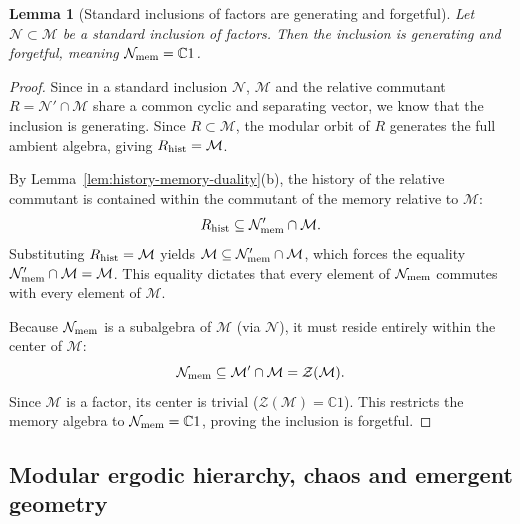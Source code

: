 \documentclass[a4paper,11pt]{article}
\newtheorem{lemma}[theorem]{Lemma}
\theoremstyle{definition}
\newcommand{\mN}{\mathcal{N}}
\newcommand{\mM}{\mathcal{M}}
\begin{document}
\begin{lemma}[Standard inclusions of factors are generating and forgetful]
\label{lem:standard-forgetful}
Let $\mathcal N \subset \mathcal M$ be a standard inclusion of factors. Then the inclusion is generating and forgetful, meaning $\mathcal N_{\rm mem} = \mathbb C1$.
\end{lemma}
\begin{proof}
Since in a standard inclusion $\mN$, $\mM$ and the relative commutant $R = \mathcal N' \cap \mathcal M$ share a common cyclic and separating vector, we know that the inclusion is generating. Since $R \subset \mathcal M$, the modular orbit of $R$ generates the full ambient algebra, giving $R_{\rm hist} = \mathcal M$. 

By Lemma~\ref{lem:history-memory-duality}(b), the history of the relative commutant is contained within the commutant of the memory relative to $\mathcal M$:
\begin{equation}
    R_{\rm hist} \subseteq \mathcal N_{\rm mem}' \cap \mathcal M.
\end{equation}
Substituting $R_{\rm hist} = \mathcal M$ yields $\mathcal M \subseteq \mathcal N_{\rm mem}' \cap \mathcal M$, which forces the equality $\mathcal N_{\rm mem}' \cap \mathcal M = \mathcal M$. This equality dictates that every element of $\mathcal N_{\rm mem}$ commutes with every element of $\mathcal M$. 

Because $\mathcal N_{\rm mem}$ is a subalgebra of $\mathcal M$ (via $\mathcal N$), it must reside entirely within the center of $\mathcal M$:
\begin{equation}
    \mathcal N_{\rm mem} \subseteq \mathcal M' \cap \mathcal M = \mathcal Z(\mathcal M).
\end{equation}
Since $\mathcal M$ is a factor, its center is trivial ($\mathcal Z(\mathcal M) = \mathbb C1$). This restricts the memory algebra to $\mathcal N_{\rm mem} = \mathbb C1$, proving the inclusion is forgetful.
\end{proof}

\subsection{Modular ergodic hierarchy, chaos and emergent geometry}\label{subsec:QEC-hierarchy}
\end{document}
